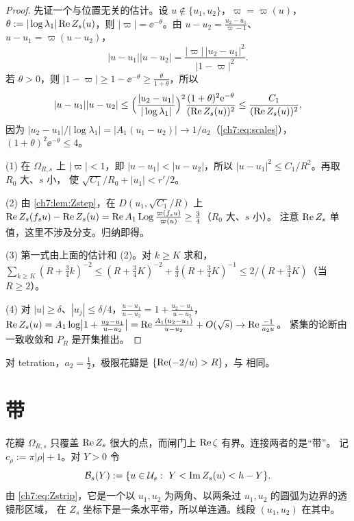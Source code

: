 \begin{proof}
先证一个与位置无关的估计。设 $u\notin\{u_1,u_2\}$，$\varpi=\varpi(u)$，
$\theta:=|\log\lambda_1|\operatorname{Re} Z_s(u)$，则 $|\varpi|=\ee^{-\theta}$。由 $u-u_2=\frac{u_2-u_1}{\varpi-1}$、$u-u_1=\varpi(u-u_2)$，
\begin{equation}\label{ch7:eq:apollonius}
 |u-u_1||u-u_2|=\frac{|\varpi|\,|u_2-u_1|^2}{|1-\varpi|^2}.
\end{equation}
若 $\theta>0$，则 $|1-\varpi|\ge1-\ee^{-\theta}\ge\frac{\theta}{1+\theta}$，所以
\[
 |u-u_1||u-u_2|\le\Bigl(\frac{|u_2-u_1|}{|\log\lambda_1|}\Bigr)^2\frac{(1+\theta)^2\mathrm{e}^{-\theta}}{(\operatorname{Re} Z_s(u))^2}
 \le\frac{C_1}{(\operatorname{Re} Z_s(u))^2},
\]
因为 $|u_2-u_1|/|\log\lambda_1|=|A_1(u_1-u_2)|\to1/a_2$（\eqref{ch7:eq:scales}），$(1+\theta)^2\ee^{-\theta}\le4$。

(1) 在 $\Omega_{R,s}$ 上 $|\varpi|<1$，即 $|u-u_1|<|u-u_2|$，所以 $|u-u_1|^2\le C_1/R^2$。再取 $R_0$ 大、$s$ 小，
使 $\sqrt{C_1}/R_0+|u_1|<r'/2$。

(2) 由 \cref{ch7:lem:Zstep}，在 $D(u_1,\sqrt{C_1}/R)$ 上
$\operatorname{Re} Z_s(f_su)-\operatorname{Re} Z_s(u)=\operatorname{Re} A_1\operatorname{Log}\frac{\varpi(f_su)}{\varpi(u)}\ge\frac34$（$R_0$ 大、$s$ 小）。
注意 $\operatorname{Re} Z_s$ 单值，这里不涉及分支。归纳即得。

(3) 第一式由上面的估计和 (2)。对 $k\ge K$ 求和，$\sum_{k\ge K}(R+\frac34k)^{-2}\le(R+\frac34K)^{-2}+\frac43(R+\frac34K)^{-1}\le2/(R+\frac34K)$（当 $R\ge2$）。

(4) 对 $|u|\ge\delta$、$|u_j|\le\delta/4$，$\frac{u-u_1}{u-u_2}=1+\frac{u_2-u_1}{u-u_2}$，
$\operatorname{Re} Z_s(u)=A_1\log\bigl|1+\frac{u_2-u_1}{u-u_2}\bigr|=\operatorname{Re}\frac{A_1(u_2-u_1)}{u-u_2}+O(\sqrt s)\to\operatorname{Re}\frac{-1}{a_2u}$。
紧集的论断由一致收敛和 $P_R$ 是开集推出。
\end{proof}

对 tetration，$a_2=\frac12$，极限花瓣是 $\{\operatorname{Re}(-2/u)>R\}$，与 \cite[引理~4.3]{KneserPaper} 相同。

\section{带}\label{ch7:sec:band}

花瓣 $\Omega_{R,s}$ 只覆盖 $\operatorname{Re} Z_s$ 很大的点，而闸门上 $\operatorname{Re}\zeta$ 有界。连接两者的是``带''。
记 $c_\rho:=\pi|\rho|+1$。对 $Y>0$ 令
\[
 \mathcal B_s(Y):=\{u\in\mathcal U_s:\ Y<\operatorname{Im} Z_s(u)<h-Y\}.
\]
由 \eqref{ch7:eq:Zstrip}，它是一个以 $u_1,u_2$ 为两角、以两条过 $u_1,u_2$ 的圆弧为边界的透镜形区域，
在 $Z_s$ 坐标下是一条水平带，所以单连通。线段 $(u_1,u_2)$ 在其中。

